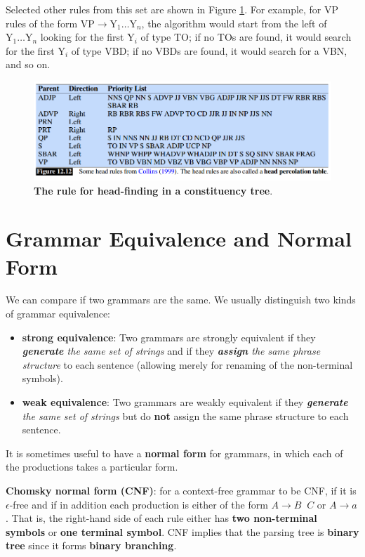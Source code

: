 \documentclass[11pt]{article}
\begin{document}
Selected other rules from this set are shown in Figure \ref{fig: head_finding_rules}. For example, for VP
rules of the form $\text{VP} \rightarrow \text{Y}_1 \ldots \text{Y}_n$, the algorithm would start from the left of $\text{Y}_1 \ldots \text{Y}_n$ looking for the first $\text{Y}_i$ of type TO; if no TOs are found, it would search for the first $\text{Y}_i$ of type VBD; if no VBDs are found, it would search for a VBN, and so on.


\begin{figure}
\begin{minipage}[t]{1\linewidth}
  \centering
  \centerline{\includegraphics[scale = 0.5]{head_finding_rules.png}}
\end{minipage}
\caption{\footnotesize{\textbf{The rule for head-finding in a constituency tree}.}}
\label{fig: head_finding_rules}
\end{figure}

\section{Grammar Equivalence and Normal Form}
We can compare if two grammars are the same. We usually distinguish two kinds of grammar equivalence: 
\begin{itemize}
\item \textbf{strong equivalence}: Two grammars are strongly equivalent if they \emph{\textbf{generate} the same set of strings} and if they \emph{\textbf{assign} the same phrase structure} to each sentence (allowing merely for renaming of the non-terminal symbols). 
\item \textbf{weak equivalence}: Two grammars are weakly equivalent if they \emph{\textbf{generate} the same set of strings} but do \textbf{not} assign the same phrase structure to each sentence.
\end{itemize}
It is sometimes useful to have a \textbf{normal form} for grammars, in which each of the productions takes a particular form. 

\textbf{Chomsky normal form (CNF)}: for a context-free grammar to be CNF, if it is $\epsilon$-free and if in addition each production is either of the form $A \rightarrow B\;\; C$ or $A \rightarrow a$.  That is, the right-hand side of each rule either has \textbf{two non-terminal symbols} or \textbf{one terminal symbol}. CNF implies that the parsing tree is \textbf{binary tree} since it forms \textbf{binary branching}.
\end{document}
